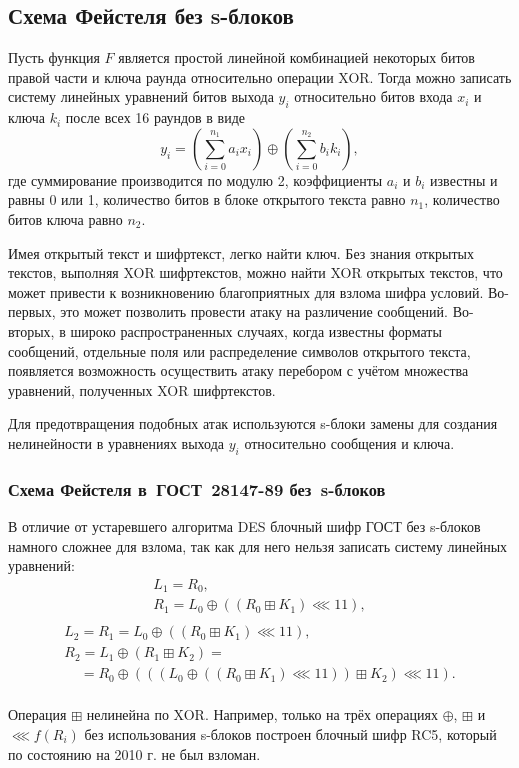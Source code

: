 \subsection{Схема Фейстеля без s-блоков}

Пусть функция $F$ является простой линейной комбинацией некоторых битов правой части и ключа раунда относительно операции XOR. Тогда можно записать систему линейных уравнений битов выхода $y_i$ относительно битов входа $x_i$ и ключа $k_i$ после всех 16 раундов в виде
    \[ y_i = \left(\sum_{i=0}^{n_1} a_i x_i\right) \oplus \left(\sum_{i=0}^{n_2} b_i k_i\right), \]
где суммирование производится по модулю 2, коэффициенты $a_i$ и $b_i$ известны и равны 0 или 1, количество битов в блоке открытого текста равно $n_1$, количество битов ключа равно $n_2$.

Имея открытый текст и шифртекст, легко найти ключ. Без знания открытых текстов, выполняя XOR шифртекстов, можно найти XOR открытых текстов, что может привести к возникновению благоприятных для взлома шифра условий. Во-первых, это может позволить провести атаку на различение сообщений. Во-вторых, в широко распространенных случаях, когда известны форматы сообщений, отдельные поля или распределение символов открытого текста, появляется возможность осуществить атаку перебором с учётом множества уравнений, полученных XOR шифртекстов.

Для предотвращения подобных атак используются s-блоки замены для создания нелинейности в уравнениях выхода $y_i$ относительно сообщения и ключа.


\subsubsection[Схема Фейстеля в ГОСТ 28147-89 без s-блоков]{Схема Фейстеля в~ГОСТ~28147-89 без~s-блоков}

В отличие от устаревшего алгоритма DES блочный шифр ГОСТ без s-блоков намного сложнее для взлома, так как для него нельзя записать систему линейных уравнений:
\[
    \begin{array}{l}
        L_1 = R_0, \\
        R_1 = L_0 \oplus ((R_0 \boxplus K_1) \lll 11), \\
    \end{array}
\] \[
    \begin{array}{l}
        L_2 = R_1 = L_0 \oplus ((R_0 \boxplus K_1) \lll 11), \\
        R_2 = L_1 \oplus (R_1 \boxplus K_2)  = \\
        ~~~~~= R_0 \oplus (((L_0 \oplus ((R_0 \boxplus K_1) \lll 11)) \boxplus K_2) \lll 11). \\
    \end{array}
\]

Операция $\boxplus$ нелинейна по XOR. Например, только на трёх операциях $\oplus$, $\boxplus$ и $\lll f(R_i)$ без использования s-блоков построен блочный шифр RC5, который по состоянию на 2010 г. не был взломан.
